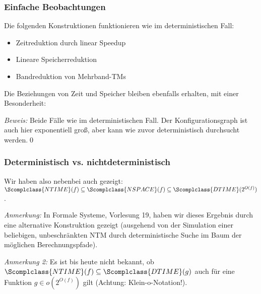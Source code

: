 \documentclass[aspectratio=1610,onlymath]{beamer}
\begin{document}
\begin{frame}\frametitle{Einfache Beobachtungen}


Die folgenden Konstruktionen funktionieren wie im deterministischen Fall:
\begin{itemize}
\item Zeitreduktion durch linear Speedup
\item Lineare Speicherreduktion
\item Bandreduktion von Mehrband-TMs
\end{itemize}\pause

Die Beziehungen von Zeit und Speicher bleiben ebenfalls erhalten, mit einer Besonderheit:
\medskip


\pause\emph{Beweis:} Beide Fälle wie im deterministischen Fall.
Der Konfigurationsgraph ist auch hier
exponentiell groß, aber kann wie zuvor deterministisch durchsucht werden.\qed

\end{frame}

\begin{frame}\frametitle{Deterministisch vs. nichtdeterministisch}

Wir haben also nebenbei auch gezeigt: $\Scomplclass{NTIME}(f) \subseteq \Scomplclass{NSPACE}(f)\subseteq \Scomplclass{DTIME}(2^{O(f)})$.\bigskip


\emph{Anmerkung:} In Formale Systeme, Vorlesung 19, haben wir dieses Ergebnis durch eine alternative Konstruktion gezeigt (ausgehend von der Simulation einer beliebigen, unbeschränkten NTM durch deterministische Suche im Baum der möglichen Berechnungspfade).
\bigskip

\emph{Anmerkung 2:} Es ist bis heute nicht bekannt, ob $\Scomplclass{NTIME}(f) \subseteq \Scomplclass{DTIME}(g)$ auch für eine Funktion $g\in o(2^{O(f)})$ gilt
(Achtung: Klein-o-Notation!).
%

\end{frame}
\end{document}
